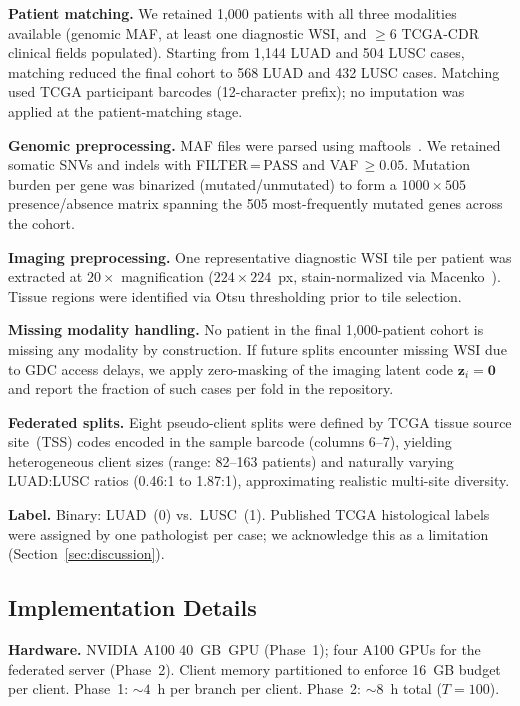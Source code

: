 \documentclass[journal,draftclsnofoot,10pt,onecolumn]{IEEEtran}
\begin{document}
\textbf{Patient matching.}
We retained 1,000 patients with all three modalities available (genomic MAF,
at least one diagnostic WSI, and $\geq\!6$ TCGA-CDR clinical fields populated).
Starting from 1,144 LUAD and 504 LUSC cases, matching reduced the final cohort
to 568 LUAD and 432 LUSC cases. Matching used TCGA participant barcodes
(12-character prefix); no imputation was applied at the patient-matching stage.

\textbf{Genomic preprocessing.}
MAF files were parsed using maftools~\cite{mayakonda2018maftools}. We retained
somatic SNVs and indels with FILTER\,=\,PASS and VAF\,$\geq\!0.05$. Mutation
burden per gene was binarized (mutated/unmutated) to form a
$1000\!\times\!505$ presence/absence matrix spanning the 505 most-frequently
mutated genes across the cohort.

\textbf{Imaging preprocessing.}
One representative diagnostic WSI tile per patient was extracted at $20\times$
magnification ($224\!\times\!224$~px, stain-normalized via
Macenko~\cite{macenko2009}). Tissue regions were identified via Otsu thresholding
prior to tile selection.

\textbf{Missing modality handling.}
No patient in the final 1,000-patient cohort is missing any modality by
construction. If future splits encounter missing WSI due to GDC access delays,
we apply zero-masking of the imaging latent code $\mathbf{z}_i\!=\!\mathbf{0}$
and report the fraction of such cases per fold in the repository.

\textbf{Federated splits.}
Eight pseudo-client splits were defined by TCGA tissue source site~(TSS) codes
encoded in the sample barcode (columns 6--7), yielding heterogeneous client
sizes (range: 82--163 patients) and naturally varying LUAD:LUSC ratios
(0.46:1 to 1.87:1), approximating realistic multi-site diversity.

\textbf{Label.} Binary: LUAD~(0) vs.\ LUSC~(1). Published TCGA histological
labels were assigned by one pathologist per case; we acknowledge this as a
limitation (Section~\ref{sec:discussion}).

\subsection{Implementation Details}

\textbf{Hardware.} NVIDIA A100 40~GB~GPU (Phase~1); four A100 GPUs for the
federated server (Phase~2). Client memory partitioned to enforce 16~GB
budget per client. Phase~1: ${\sim}4$~h per branch per client.
Phase~2: ${\sim}8$~h total ($T\!=\!100$).
\end{document}
